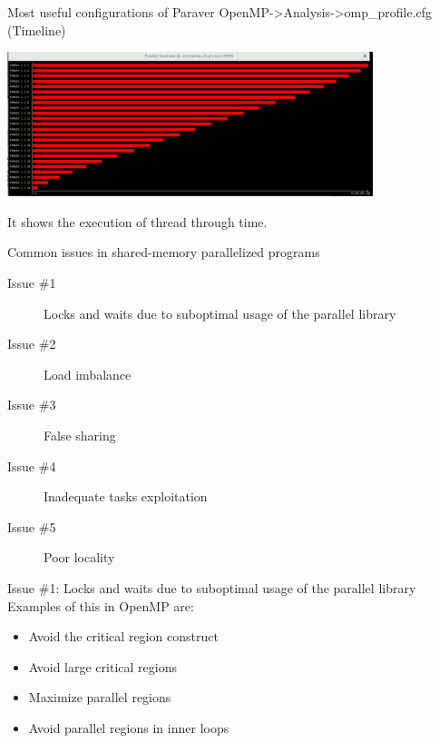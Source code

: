 \documentclass[10pt,xcolor=table]{beamer}
\begin{document}
\begin{frame}{Most useful configurations of Paraver}
\centering
OpenMP->Analysis->omp\_profile.cfg (Timeline)

\includegraphics[width=0.8\textwidth]{figs/omp_profile_timeline.png}

It shows the execution of thread through time. 
\end{frame}

\begin{frame}{Common issues in shared-memory parallelized programs}
\begin{description}
\item[Issue \#1] Locks and waits due to suboptimal usage of the parallel library
\item[Issue \#2] Load imbalance
\item[Issue \#3] False sharing
\item[Issue \#4] Inadequate tasks exploitation
\item[Issue \#5] Poor locality
\end{description}
\end{frame}

\begin{frame}{Issue \#1: Locks and waits due to suboptimal usage of the parallel library}
Examples of this in OpenMP are:
\begin{itemize}
    \item Avoid the critical region construct
    \item Avoid large critical regions
    \item Maximize parallel regions
    \item Avoid parallel regions in inner loops
\end{itemize}
\end{frame}
\end{document}
